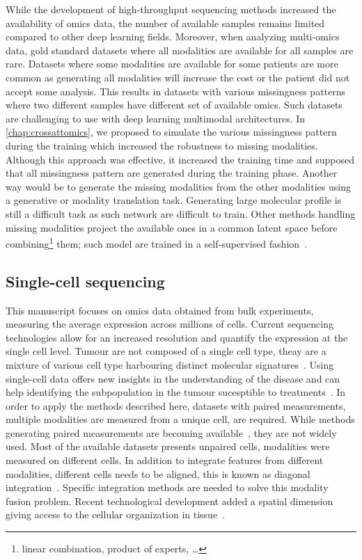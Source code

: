 \documentclass[../main.tex]{subfiles}
\begin{document}
		While the development of high-throughput sequencing methods increased the availability of omics data, the number of available samples remains limited compared to other deep learning fields.
		Moreover, when analyzing multi-omics data, gold standard datasets where all modalities are available for all samples are rare.
		Datasets where some modalities are available for some patients are more common as generating all modalities will increase the cost or the patient did not accept some analysis.
		This results in datasets with various missingness patterns where two different samples have different set of available omics.
		Such datasets are challenging to use with deep learning multimodal architectures.
		In \cref{chap:crossattomics}, we proposed to simulate the various missingness pattern during the training which increased the robustness to missing modalities.
		Although this approach was effective, it increased the training time and supposed that all missingness pattern are generated during the training phase.
		Another way would be to generate the missing modalities from the other modalities using a generative or modality translation task.
		Generating large molecular profile is still a difficult task as such network are difficult to train.
		Other methods handling missing modalities project the available ones in a common latent space before combining\footnote{linear combination, product of experts, \dots} them; such model are trained in a self-supervised fashion~\cite{Lee2021AVI}.

	\subsection{Single-cell sequencing}
		This manuscript focuses on omics data obtained from bulk experiments, measuring the average expression across millions of cells.
		Current sequencing technologies allow for an increased resolution and quantify the expression at the single cell level.
		Tumour are not composed of a single cell type, theay are a mixture of various cell type harbouring distinct molecular signatures~\cite{TumourHetero}.
		Using single-cell data offers new insights in the understanding of the disease and can help identifying the subpopulation in the tumour sucesptible to treatments~\cite{DagogoJack2017}.
		In order to apply the methods described here, datasets with paired measurements, multiple modalities are measured from a unique cell, are required.
		While methods generating paired measurements are becoming available~\cite{Macaulay2015,Hao2021,Vandereyken2023}, they are not widely used.
		Most of the available datasets presents unpaired cells, modalities were measured on different cells.
		In addition to integrate features from different modalities, different cells needs to be aligned, this is known as diagonal integration~\cite{Xu2022}.
		Specific integration methods are needed to solve this modality fusion problem.
		Recent technological development added a spatial dimension giving access to the cellular organization in tissue~\cite{Vandereyken2023}.
\end{document}
